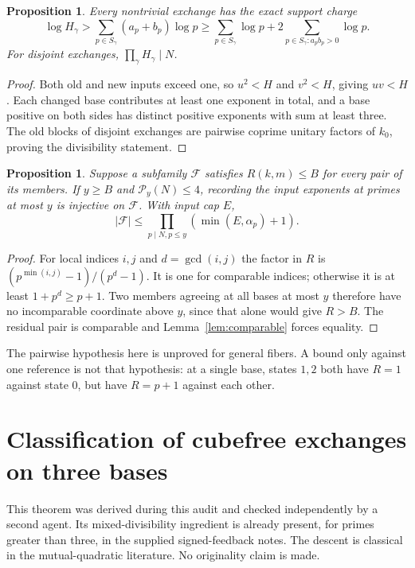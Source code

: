 \documentclass[11pt,a4paper]{article}
\newtheorem{proposition}[theorem]{Proposition}
\theoremstyle{remark}
\newcommand{\PP}{\mathcal P}
\newcommand{\F}{\mathcal F}
\begin{document}
\begin{proposition}\label{prop:cost}
Every nontrivial exchange has the exact support charge
\[
 \log H_\gamma>\sum_{p\in S_\gamma}(a_p+b_p)\log p
 \ge\sum_{p\in S_\gamma}\log p
     +2\sum_{p\in S_\gamma:a_pb_p>0}\log p.
\]
For disjoint exchanges, $\prod_\gamma H_\gamma\mid N$.
\end{proposition}
\begin{proof}
Both old and new inputs exceed one, so $u^2<H$ and $v^2<H$, giving
$uv<H$. Each changed base contributes at least one exponent in total, and
a base positive on both sides has distinct positive exponents with sum at
least three. The old blocks of disjoint exchanges are pairwise coprime
unitary factors of $k_0$, proving the divisibility statement.
\end{proof}

\begin{proposition}\label{prop:pairwise}
Suppose a subfamily $\F$ satisfies $R(k,m)\le B$ for every pair of its
members. If $y\ge B$ and $\PP_y(N)\le4$, recording the input exponents at
primes at most $y$ is injective on $\F$. With input cap $E$,
\[
 |\F|\le\prod_{p\mid N,p\le y}(\min(E,\alpha_p)+1).
\]
\end{proposition}
\begin{proof}
For local indices $i,j$ and $d=\gcd(i,j)$ the factor in $R$ is
$(p^{\min(i,j)}-1)/(p^d-1)$. It is one for comparable indices; otherwise
it is at least $1+p^d\ge p+1$. Two members agreeing at all bases at most
$y$ therefore have no incomparable coordinate above $y$, since that alone
would give $R>B$. The residual pair is comparable and
Lemma~\ref{lem:comparable} forces equality.
\end{proof}
The pairwise hypothesis here is unproved for general fibers. A bound only
against one reference is not that hypothesis: at a single base, states $1,2$
both have $R=1$ against state $0$, but have $R=p+1$ against each other.

\section{Classification of cubefree exchanges on three bases}\label{sec:three}
This theorem was derived during this audit and checked independently by a
second agent. Its mixed-divisibility ingredient is already present, for primes
greater than three, in the supplied signed-feedback notes. The descent is
classical in the mutual-quadratic literature. No originality claim is made.
\end{document}
